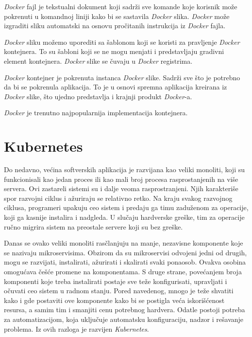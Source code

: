 \textit{Docker} fajl je tekstualni dokument koji sadrži sve komande koje korisnik može pokrenuti 
u komandnoj liniji kako bi se sastavila \textit{Docker} slika. \textit{Docker} može izgraditi sliku automatski 
na osnovu pročitanih instrukcija iz \textit{Docker} fajla.

\textit{Docker} sliku možemo uporediti sa šablonom koji se koristi za pravljenje \textit{Docker} kontejnera. 
To su šabloni koji se ne mogu menjati i predstavljaju gradivni element kontejnera.
\textit{Docker} slike se čuvaju u \textit{Docker} registrima. 

\textit{Docker} kontejner je pokrenuta instanca \textit{Docker} slike. Sadrži sve što je potrebno da bi se 
pokrenula aplikacija. To je u osnovi spremna aplikacija kreirana iz \textit{Docker} slike, 
što ujedno predstavlja i krajnji produkt \textit{Docker}-a.~\cite{docker}

\textit{Docker} je trenutno najpopularnija implementacija kontejnera.

\section{Kubernetes}\label{sec:kubernetes}

Do nedavno, većina softverskih aplikacija je razvijana kao veliki monoliti, koji su funkcionisali kao jedan proces 
ili kao mali broj procesa rasprostanjenih na više servera. Ovi zastareli sistemi su i dalje veoma rasprostranjeni. 
Njih karakteriše spor razvojni ciklus i ažuriraju se relativno retko. Na kraju svakog razvojnog ciklusa, programeri
upakuju ceo sistem i predaju ga timu zaduženom za operacije, koji ga kasnije instalira i nadgleda. U slučaju hardverske
greške, tim za operacije ručno migrira sistem na preostale servere koji su bez greške.

Danas se ovako veliki monoliti rasčlanjuju na manje, nezavisne komponente koje se nazivaju mikroservisima. Obzirom
da su mikroservisi odvojeni jedni od drugih, mogu se razvijati, instalirati, ažurirati i skalirati svaki ponaosob.
Ovakva osobina omogućava češće promene na komponentama. S druge strane, povećanjem broja komponenti koje treba 
instalirati postaje sve teže konfigurisati, upravljati i očuvati ceo sistem u radnom stanju. Pored navedenog, mnogo 
je teže shvatiti kako i gde postaviti ove komponente kako bi se postigla veća iskorišćenost resursa, a samim tim i 
smanjiti cenu potrebnog hardvera. Odatle postoji potreba za automatizacijom, koja uključuje automatsku konfiguraciju,
nadzor  i rešavanje problema. Iz ovih razloga je razvijen \textit{Kubernetes}.

